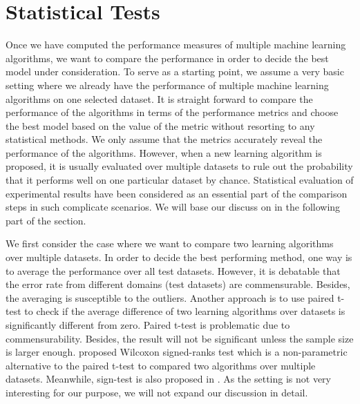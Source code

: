 {%
%

\section{Statistical Tests} \label{sc_st}

Once we have computed the performance measures of multiple machine learning algorithms, we want to compare the performance in order to decide the best model under consideration. 
To serve as a starting point, we assume a very basic setting where we already have the performance of multiple machine learning algorithms on one selected dataset.
It is straight forward to compare the performance of the algorithms in terms of the performance metrics and choose the best model based on the value of the metric without resorting to any statistical methods.
We only assume that the metrics accurately reveal the performance of the algorithms.
However, when a new learning algorithm is proposed, it is usually evaluated over multiple datasets to rule out the probability that it performs well on one particular dataset by chance.
Statistical evaluation of experimental results have been considered as an essential part of the comparison steps in such complicate scenarios.
We will base our discuss on \citep{Demsar06statistical,Garcia08an} in the following part of the section.

We first consider the case where we want to compare two learning algorithms over multiple datasets.
In order to decide the best performing method, one way is to average the performance over all test datasets.
However, it is debatable that the error rate from different domains (test datasets) are commensurable.
Besides, the averaging is susceptible to the outliers.
Another approach is to use paired t-test to check if the average difference of two learning algorithms over datasets is significantly different from zero.
Paired t-test is problematic due to commensurability.
Besides, the result will not be significant unless the sample size is larger enough.
\citet{Demsar06statistical} proposed Wilcoxon signed-ranks test which is a non-parametric alternative to the paired t-test to compared two algorithms over multiple datasets.
Meanwhile, sign-test is also proposed in \citep{Demsar06statistical}.
As the setting is not very interesting for our purpose, we will not expand our discussion in detail.

}
